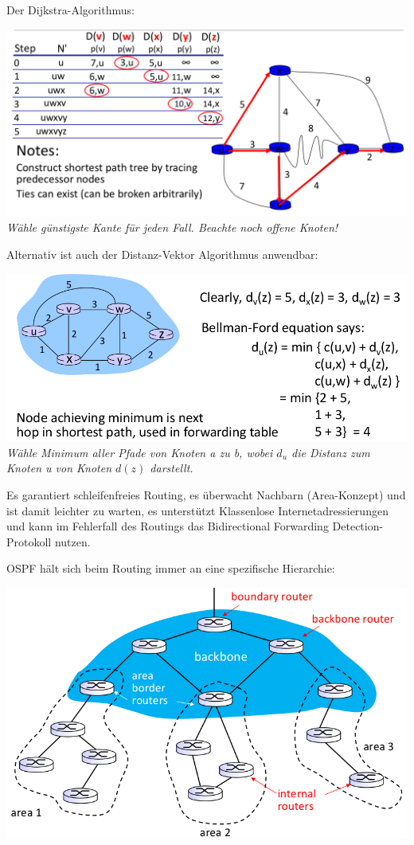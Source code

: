 \documentclass{scrartcl}
\begin{document}
    Der Dijkstra-Algorithmus:
    \begin{center}
        \includegraphics[width=\textwidth]{Dijkstra.png}\\
        \textit{Wähle günstigste Kante für jeden Fall. Beachte noch offene Knoten!}
    \end{center}
    
Alternativ ist auch der Distanz-Vektor Algorithmus anwendbar:
    \begin{center}
        \includegraphics[width=\textwidth]{DistanceVector.png}\\
    \textit{Wähle Minimum aller Pfade von Knoten a zu b, wobei $d_u$ die Distanz zum Knoten u von Knoten $d(z)$ darstellt.}
    \end{center}
    
    Es garantiert schleifenfreies Routing, es überwacht Nachbarn (Area-Konzept) und ist damit leichter zu warten, es unterstützt Klassenlose Internetadressierungen und kann im Fehlerfall des Routings das Bidirectional Forwarding Detection-Protokoll nutzen.
    
    OSPF hält sich beim Routing immer an eine spezifische Hierarchie:
    \begin{center}
        \includegraphics[width=\textwidth]{HierarchicalOSPF.png}
    \end{center}
    
\end{document}
